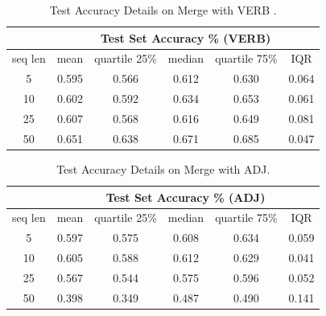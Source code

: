 \documentclass[12pt]{article}
\begin{document}
\begin{table}[!h]
\begin{tabular}{c|ccccc|}
\cline{2-6}
\multicolumn{1}{l|}{}         & \multicolumn{5}{c|}{Test Set Accuracy \% (VERB)}                                                                                           \\ \hline
\multicolumn{1}{|c|}{seq len} & \multicolumn{1}{c|}{mean}  & \multicolumn{1}{c|}{quartile 25\%} & \multicolumn{1}{c|}{median} & \multicolumn{1}{c|}{quartile 75\%} & IQR   \\ \hline
\multicolumn{1}{|c|}{5}       & \multicolumn{1}{c|}{0.595} & \multicolumn{1}{c|}{0.566}         & \multicolumn{1}{c|}{0.612}  & \multicolumn{1}{c|}{0.630}         & 0.064 \\ \hline
\multicolumn{1}{|c|}{10}      & \multicolumn{1}{c|}{0.602} & \multicolumn{1}{c|}{0.592}         & \multicolumn{1}{c|}{0.634}  & \multicolumn{1}{c|}{0.653}         & 0.061 \\ \hline
\multicolumn{1}{|c|}{25}      & \multicolumn{1}{c|}{0.607} & \multicolumn{1}{c|}{0.568}         & \multicolumn{1}{c|}{0.616}  & \multicolumn{1}{c|}{0.649}         & 0.081 \\ \hline
\multicolumn{1}{|c|}{50}      & \multicolumn{1}{c|}{0.651} & \multicolumn{1}{c|}{0.638}         & \multicolumn{1}{c|}{0.671}  & \multicolumn{1}{c|}{0.685}         & 0.047 \\ \hline
\end{tabular}
\caption{Test Accuracy Details on Merge with VERB .}
\label{appendix:verbMerge}
\end{table}

\begin{table}[!h]
\begin{tabular}{c|ccccc|}
\cline{2-6}
\multicolumn{1}{l|}{}         & \multicolumn{5}{c|}{Test Set Accuracy \% (ADJ)}                                                                                            \\ \hline
\multicolumn{1}{|c|}{seq len} & \multicolumn{1}{c|}{mean}  & \multicolumn{1}{c|}{quartile 25\%} & \multicolumn{1}{c|}{median} & \multicolumn{1}{c|}{quartile 75\%} & IQR   \\ \hline
\multicolumn{1}{|c|}{5}       & \multicolumn{1}{c|}{0.597} & \multicolumn{1}{c|}{0.575}         & \multicolumn{1}{c|}{0.608}  & \multicolumn{1}{c|}{0.634}         & 0.059 \\ \hline
\multicolumn{1}{|c|}{10}      & \multicolumn{1}{c|}{0.605} & \multicolumn{1}{c|}{0.588}         & \multicolumn{1}{c|}{0.612}  & \multicolumn{1}{c|}{0.629}         & 0.041 \\ \hline
\multicolumn{1}{|c|}{25}      & \multicolumn{1}{c|}{0.567} & \multicolumn{1}{c|}{0.544}         & \multicolumn{1}{c|}{0.575}  & \multicolumn{1}{c|}{0.596}         & 0.052 \\ \hline
\multicolumn{1}{|c|}{50}      & \multicolumn{1}{c|}{0.398} & \multicolumn{1}{c|}{0.349}         & \multicolumn{1}{c|}{0.487}  & \multicolumn{1}{c|}{0.490}         & 0.141 \\ \hline
\end{tabular}
\caption{Test Accuracy Details on Merge with ADJ.}
\label{appendix:adjMerge}
\end{table}
\end{document}
